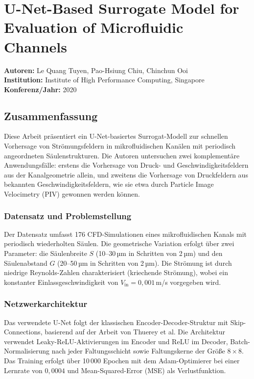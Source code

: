 \documentclass[a4paper,12pt]{article}
\begin{document}
\section*{U-Net-Based Surrogate Model for Evaluation of Microfluidic Channels}

\textbf{Autoren:} Le Quang Tuyen, Pao-Hsiung Chiu, Chinchun Ooi \\
\textbf{Institution:} Institute of High Performance Computing, Singapore \\
\textbf{Konferenz/Jahr:} 2020

\subsection*{Zusammenfassung}

Diese Arbeit präsentiert ein U-Net-basiertes Surrogat-Modell zur schnellen Vorhersage von Strömungsfeldern in mikrofluidischen Kanälen mit periodisch angeordneten Säulenstrukturen. Die Autoren untersuchen zwei komplementäre Anwendungsfälle: erstens die Vorhersage von Druck- und Geschwindigkeitsfeldern aus der Kanalgeometrie allein, und zweitens die Vorhersage von Druckfeldern aus bekannten Geschwindigkeitsfeldern, wie sie etwa durch Particle Image Velocimetry (PIV) gewonnen werden können.

\subsubsection*{Datensatz und Problemstellung}

Der Datensatz umfasst 176 CFD-Simulationen eines mikrofluidischen Kanals mit periodisch wiederholten Säulen. Die geometrische Variation erfolgt über zwei Parameter: die Säulenbreite $S$ (10--30\,µm in Schritten von 2\,µm) und den Säulenabstand $G$ (20--50\,µm in Schritten von 2\,µm). Die Strömung ist durch niedrige Reynolds-Zahlen charakterisiert (kriechende Strömung), wobei ein konstanter Einlassgeschwindigkeit von $V_{\text{in}} = 0{,}001$\,m/s vorgegeben wird.

\subsubsection*{Netzwerkarchitektur}

Das verwendete U-Net folgt der klassischen Encoder-Decoder-Struktur mit Skip-Connections, basierend auf der Arbeit von Thuerey et al. Die Architektur verwendet Leaky-ReLU-Aktivierungen im Encoder und ReLU im Decoder, Batch-Normalisierung nach jeder Faltungsschicht sowie Faltungskerne der Größe $8 \times 8$. Das Training erfolgt über 10\,000 Epochen mit dem Adam-Optimierer bei einer Lernrate von $0{,}0004$ und Mean-Squared-Error (MSE) als Verlustfunktion.
\end{document}
